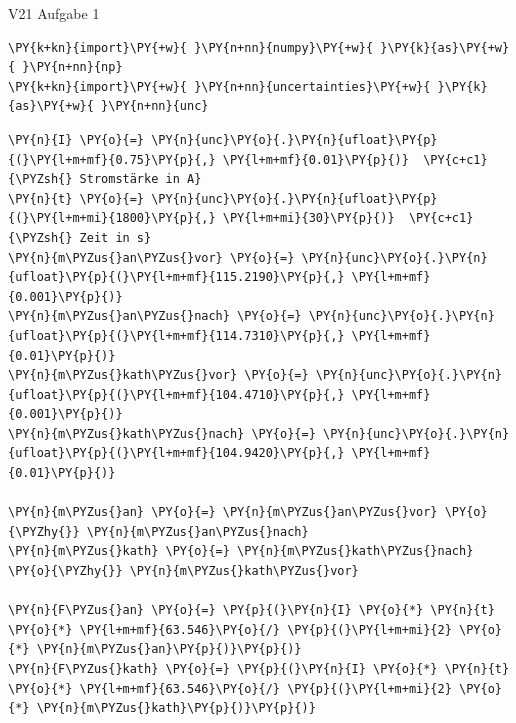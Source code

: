
    
    V21 Aufgabe 1

    \begin{tcolorbox}[breakable, size=fbox, boxrule=1pt, pad at break*=1mm,colback=cellbackground, colframe=cellborder]
\begin{Verbatim}[commandchars=\\\{\}]
\PY{k+kn}{import}\PY{+w}{ }\PY{n+nn}{numpy}\PY{+w}{ }\PY{k}{as}\PY{+w}{ }\PY{n+nn}{np}
\PY{k+kn}{import}\PY{+w}{ }\PY{n+nn}{uncertainties}\PY{+w}{ }\PY{k}{as}\PY{+w}{ }\PY{n+nn}{unc}
\end{Verbatim}
\end{tcolorbox}

    \begin{tcolorbox}[breakable, size=fbox, boxrule=1pt, pad at break*=1mm,colback=cellbackground, colframe=cellborder]
\begin{Verbatim}[commandchars=\\\{\}]
\PY{n}{I} \PY{o}{=} \PY{n}{unc}\PY{o}{.}\PY{n}{ufloat}\PY{p}{(}\PY{l+m+mf}{0.75}\PY{p}{,} \PY{l+m+mf}{0.01}\PY{p}{)}  \PY{c+c1}{\PYZsh{} Stromstärke in A}
\PY{n}{t} \PY{o}{=} \PY{n}{unc}\PY{o}{.}\PY{n}{ufloat}\PY{p}{(}\PY{l+m+mi}{1800}\PY{p}{,} \PY{l+m+mi}{30}\PY{p}{)}  \PY{c+c1}{\PYZsh{} Zeit in s}
\PY{n}{m\PYZus{}an\PYZus{}vor} \PY{o}{=} \PY{n}{unc}\PY{o}{.}\PY{n}{ufloat}\PY{p}{(}\PY{l+m+mf}{115.2190}\PY{p}{,} \PY{l+m+mf}{0.001}\PY{p}{)} 
\PY{n}{m\PYZus{}an\PYZus{}nach} \PY{o}{=} \PY{n}{unc}\PY{o}{.}\PY{n}{ufloat}\PY{p}{(}\PY{l+m+mf}{114.7310}\PY{p}{,} \PY{l+m+mf}{0.01}\PY{p}{)} 
\PY{n}{m\PYZus{}kath\PYZus{}vor} \PY{o}{=} \PY{n}{unc}\PY{o}{.}\PY{n}{ufloat}\PY{p}{(}\PY{l+m+mf}{104.4710}\PY{p}{,} \PY{l+m+mf}{0.001}\PY{p}{)}
\PY{n}{m\PYZus{}kath\PYZus{}nach} \PY{o}{=} \PY{n}{unc}\PY{o}{.}\PY{n}{ufloat}\PY{p}{(}\PY{l+m+mf}{104.9420}\PY{p}{,} \PY{l+m+mf}{0.01}\PY{p}{)}

\PY{n}{m\PYZus{}an} \PY{o}{=} \PY{n}{m\PYZus{}an\PYZus{}vor} \PY{o}{\PYZhy{}} \PY{n}{m\PYZus{}an\PYZus{}nach}
\PY{n}{m\PYZus{}kath} \PY{o}{=} \PY{n}{m\PYZus{}kath\PYZus{}nach} \PY{o}{\PYZhy{}} \PY{n}{m\PYZus{}kath\PYZus{}vor}

\PY{n}{F\PYZus{}an} \PY{o}{=} \PY{p}{(}\PY{n}{I} \PY{o}{*} \PY{n}{t} \PY{o}{*} \PY{l+m+mf}{63.546}\PY{o}{/} \PY{p}{(}\PY{l+m+mi}{2} \PY{o}{*} \PY{n}{m\PYZus{}an}\PY{p}{)}\PY{p}{)}
\PY{n}{F\PYZus{}kath} \PY{o}{=} \PY{p}{(}\PY{n}{I} \PY{o}{*} \PY{n}{t} \PY{o}{*} \PY{l+m+mf}{63.546}\PY{o}{/} \PY{p}{(}\PY{l+m+mi}{2} \PY{o}{*} \PY{n}{m\PYZus{}kath}\PY{p}{)}\PY{p}{)}


\end{Verbatim}
\end{tcolorbox}
